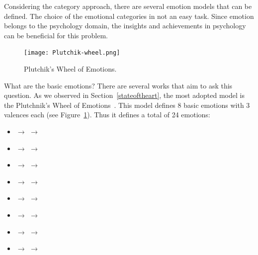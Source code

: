 Considering the category approach, there are several emotion models that can be defined. The choice of the emotional categories in not an easy task.
Since emotion belongs to the psychology domain, the insights and achievements in psychology can be beneficial for this problem.




\begin{figure}[t]
	\centering
	\texttt{[image: Plutchik-wheel.png]}
	\caption{Plutchik's Wheel of Emotions.}
	\label{figWheel}
\end{figure}

What are the basic emotions? There are several works that aim to ask this question. As we observed in Section~\ref{stateoftheart}, the most adopted model is the Plutchnik's Wheel of Emotions~\cite{plutchik1980general}. 
This model defines 8 basic emotions with 3 valences each (see Figure~\ref{figWheel}). Thus it defines a total of 24 emotions:
\begin{itemize}
	\item {} $\rightarrow$  $\rightarrow$ 
	\item {} $\rightarrow$  $\rightarrow$ 
	\item {} $\rightarrow$  $\rightarrow$ 
	\item {} $\rightarrow$  $\rightarrow$ 
	\item {} $\rightarrow$  $\rightarrow$ 
	\item {} $\rightarrow$  $\rightarrow$ 
	\item {} $\rightarrow$  $\rightarrow$ 
	\item {} $\rightarrow$  $\rightarrow$ 
\end{itemize}

